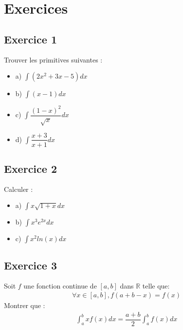 \documentclass[letterpaper,10pt,french]{sphinxmanual}
\begin{document}
\section{Exercices}
\label{\detokenize{exo2:exercices}}\label{\detokenize{exo2::doc}}

\subsection{Exercice 1}
\label{\detokenize{exo2:exercice-1}}
\sphinxAtStartPar
Trouver les primitives suivantes :
\begin{itemize}
\item {} 
\sphinxAtStartPar
a) \( \int (2x^2 + 3x - 5)dx\)

\item {} 
\sphinxAtStartPar
b) \(\int (x-1) dx\)

\item {} 
\sphinxAtStartPar
c) \(\int \dfrac{(1-x)^2}{\sqrt{x}}dx\)

\item {} 
\sphinxAtStartPar
d) \(\int \dfrac{x+3}{x+1}dx\)

\end{itemize}


\subsection{Exercice 2}
\label{\detokenize{exo2:exercice-2}}
\sphinxAtStartPar
Calculer :
\begin{itemize}
\item {} 
\sphinxAtStartPar
a) \(\int x\sqrt{1+x}dx\)

\item {} 
\sphinxAtStartPar
b) \(\int x^3e^{2x}dx\)

\item {} 
\sphinxAtStartPar
c) \(\int x^2ln(x)dx\)

\end{itemize}


\subsection{Exercice 3}
\label{\detokenize{exo2:exercice-3}}
\sphinxAtStartPar
Soit \(f\) une fonction continue de \([a, b]\) dans \(\mathbb R\) telle que:
\begin{equation*}
\begin{split}
\forall x \in [a, b], f(a+b-x)=f(x)
\end{split}
\end{equation*}
\sphinxAtStartPar
Montrer que :
\begin{equation*}
\begin{split}
\int_a^b xf(x)dx = \dfrac{a+b}{2}\int_a^b f(x)dx
\end{split}
\end{equation*}
\end{document}
